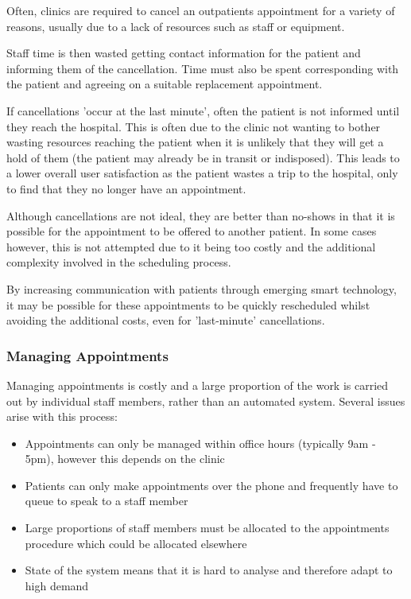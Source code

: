 Often, clinics are required to cancel an outpatients appointment for a variety of reasons, usually due to a lack of resources such as staff or equipment.

Staff time is then wasted getting contact information for the patient and informing them of the cancellation. Time must also be spent corresponding with the patient and agreeing on a suitable replacement appointment.

If cancellations 'occur at the last minute', often the patient is not informed until they reach the hospital. This is often due to the clinic not wanting to bother wasting resources reaching the patient when it is unlikely that they will get a hold of them (the patient may already be in transit or indisposed). This leads to a lower overall user satisfaction as the patient wastes a trip to the hospital, only to find that they no longer have an appointment.

Although cancellations are not ideal, they are better than no-shows in that it is possible for the appointment to be offered to another patient. In some cases however, this is not attempted due to it being too costly and the additional complexity involved in the scheduling process.

By increasing communication with patients through emerging smart technology, it may be possible for these appointments to be quickly rescheduled whilst avoiding the additional costs, even for 'last-minute' cancellations.

\subsubsection{Managing Appointments}

Managing appointments is costly and a large proportion of the work is carried out by individual staff members, rather than an automated system. Several issues arise with this process:

\begin{itemize}
	\item Appointments can only be managed within office hours (typically 9am - 5pm), however this depends on the clinic
	\item Patients can only make appointments over the phone and frequently have to queue to speak to a staff member
	\item Large proportions of staff members must be allocated to the appointments procedure which could be allocated elsewhere
	\item State of the system means that it is hard to analyse and therefore adapt to high demand
	
\end{itemize}

